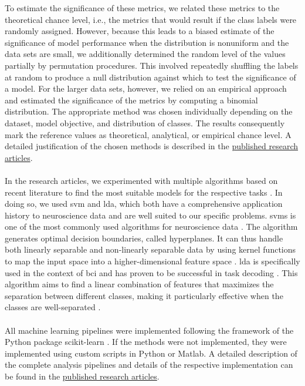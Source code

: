 \noindent To estimate the significance of these metrics, we related these metrics to the theoretical chance level, i.e., the metrics that would result if the class labels were randomly assigned. However, because this leads to a biased estimate of the significance of model performance when the distribution is nonuniform and the data sets are small, we additionally determined the random level of the values partially by permutation procedures. This involved repeatedly shuffling the labels at random to produce a null distribution against which to test the significance of a model. For the larger data sets, however, we relied on an empirical approach and estimated the significance of the metrics by computing a binomial distribution. The appropriate method was chosen individually depending on the dataset, model objective, and distribution of classes. The results consequently mark the reference values as theoretical, analytical, or empirical chance level. A detailed justification of the chosen methods is described in the \hyperref[pub:papers]{published research articles}.\\
\\
In the research articles, we experimented with multiple algorithms based on recent literature to find the most suitable models for the respective tasks \cite{Shoorangiz2023}. In doing so, we used \gls{svm} and \gls{lda}, which both have a comprehensive application history to neuroscience data and are well suited to our specific problems.  \Glspl{svm} is one of the most commonly used algorithms for neuroscience data \cite{Varoquaux2017}. The algorithm generates optimal decision boundaries, called hyperplanes. It can thus handle both linearly separable and non-linearly separable data by using kernel functions to map the input space into a higher-dimensional feature space \cite{Shoorangiz2023}. \Gls{lda} is specifically used in the context of \Gls{bci} and has proven to be successful in task decoding \cite{Blankertz2008}. This algorithm aims to find a linear combination of features that maximizes the separation between different classes, making it particularly effective when the classes are well-separated \cite{Shoorangiz2023}.\\
\\
All machine learning pipelines were implemented following the framework of the Python package scikit-learn \cite{Pedregosa2011}. If the methods were not implemented, they were implemented using custom scripts in Python or Matlab. A detailed description of the complete analysis pipelines and details of the respective implementation can be found in the \hyperref[pub:papers]{published research articles}. 
